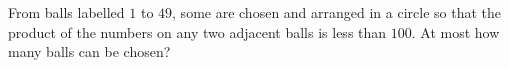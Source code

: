 From balls labelled $1$ to $49$, some are chosen and arranged in a circle so that the product of the numbers on any two adjacent balls is less than $100$. At most how many balls can be chosen?
